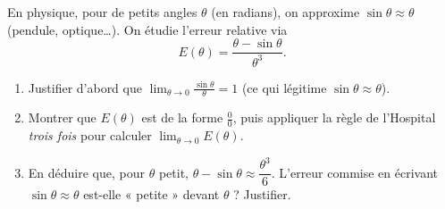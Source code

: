 \documentclass[11pt,a4paper]{article}
\begin{document}
\begin{exercice}
En physique, pour de petits angles $\theta$ (en radians), on approxime $\sin\theta\approx\theta$
(pendule, optique\dots). On étudie l'erreur relative via
\[ E(\theta)=\frac{\theta-\sin\theta}{\theta^3}. \]
\begin{enumerate}[label=\alph*),leftmargin=2em,itemsep=3pt]
  \item Justifier d'abord que $\displaystyle\lim_{\theta\to 0}\frac{\sin\theta}{\theta}=1$ (ce qui légitime $\sin\theta\approx\theta$).
  \item Montrer que $E(\theta)$ est de la forme $\frac00$, puis appliquer la règle de l'Hospital
        \emph{trois fois} pour calculer $\displaystyle\lim_{\theta\to 0} E(\theta)$.
  \item En déduire que, pour $\theta$ petit, $\theta-\sin\theta\approx \dfrac{\theta^3}{6}$. L'erreur
        commise en écrivant $\sin\theta\approx\theta$ est-elle « petite » devant $\theta$ ? Justifier.
\end{enumerate}
\end{exercice}
\end{document}
